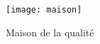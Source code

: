 

\newpage

\begin{figure}[htp]
	\centering
	\caption{Maison de la qualité}
	\label{f:cdc_maison}
	\texttt{[image: maison]}
\end{figure}